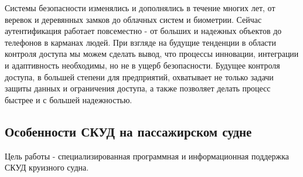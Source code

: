 Системы безопасности изменялись и дополнялись в течение многих лет, от веревок и деревянных замков до облачных систем и биометрии. Сейчас аутентификация работает повсеместно - от больших и надежных объектов до телефонов в карманах людей. При взгляде на будущие тенденции в области контроля доступа мы можем сделать вывод, что процессы инновации, интеграции и адаптивность необходимы, но не в ущерб безопасности. Будущее контроля доступа, в большей степени для предприятий, охватывает не только задачи защиты данных и ограничения доступа, а также позволяет делать процесс быстрее и с большей надежностью.   

\subsection{Особенности СКУД на пассажирском судне}
Цель работы - специализированная программная и информационная поддержка СКУД круизного судна.

